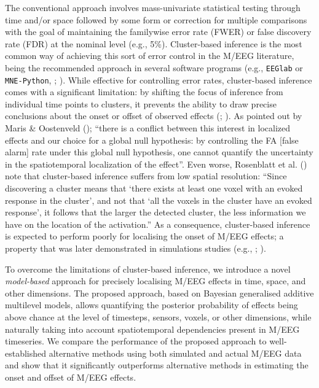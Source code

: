 \documentclass[
  man,
  floatsintext,
  longtable,
  a4paper,
  nolmodern,
  notxfonts,
  notimes,
  colorlinks=true,linkcolor=blue,citecolor=blue,urlcolor=blue]{apa7}
\begin{document}
The conventional approach involves mass-univariate statistical testing
through time and/or space followed by some form or correction for
multiple comparisons with the goal of maintaining the familywise error
rate (FWER) or false discovery rate (FDR) at the nominal level (e.g.,
5\%). Cluster-based inference is the most common way of achieving this
sort of error control in the M/EEG literature, being the recommended
approach in several software programs (e.g., \texttt{EEGlab} or
\texttt{MNE-Python}, ; ). While effective for
controlling error rates, cluster-based inference comes with a
significant limitation: by shifting the focus of inference from
individual time points to clusters, it prevents the ability to draw
precise conclusions about the onset or offset of observed effects
(;
). As
pointed out by Maris \& Oostenveld ();
``there is a conflict between this interest in localized effects and our
choice for a global null hypothesis: by controlling the FA {[}false
alarm{]} rate under this global null hypothesis, one cannot quantify the
uncertainty in the spatiotemporal localization of the effect''. Even
worse, Rosenblatt et al. () note that
cluster-based inference suffers from low spatial resolution: ``Since
discovering a cluster means that `there exists at least one voxel with
an evoked response in the cluster', and not that `all the voxels in the
cluster have an evoked response', it follows that the larger the
detected cluster, the less information we have on the location of the
activation.'' As a consequence, cluster-based inference is expected to
perform poorly for localising the onset of M/EEG effects; a property
that was later demonstrated in simulations studies (e.g.,
;
).

To overcome the limitations of cluster-based inference, we introduce a
novel \emph{model-based} approach for precisely localising M/EEG effects
in time, space, and other dimensions. The proposed approach, based on
Bayesian generalised additive multilevel models, allows quantifying the
posterior probability of effects being above chance at the level of
timesteps, sensors, voxels, or other dimensions, while naturally taking
into account spatiotemporal dependencies present in M/EEG timeseries. We
compare the performance of the proposed approach to well-established
alternative methods using both simulated and actual M/EEG data and show
that it significantly outperforms alternative methods in estimating the
onset and offset of M/EEG effects.
\end{document}
